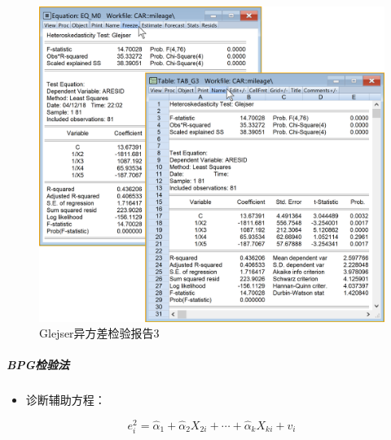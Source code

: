 \documentclass[12pt,(landscape,a4paper),(portrait,a4paper)]{article}
\providecommand{\tightlist}{%
  \setlength{\itemsep}{0pt}\setlength{\parskip}{0pt}}
\let\oldsubparagraph\subparagraph
\renewcommand{\subparagraph}[1]{\oldsubparagraph{#1}\mbox{}}
\begin{document}
\begin{figure}

{\centering \includegraphics[width=28.76in]{picture/lab6-heteroskedasticity/4-test-G3-2} 

}

\caption{Glejser异方差检验报告3}\label{fig:fig-G3-report}
\end{figure}

\hypertarget{bpg}{%
\subparagraph{BPG检验法}\label{bpg}}

\begin{itemize}
\tightlist
\item
  诊断辅助方程：
\end{itemize}

\begin{equation}
e^2_i=\hat{\alpha}_1+\hat{\alpha}_2X_{2i}+\cdots+\hat{\alpha}_kX_{ki}+v_i \label{eq:A-BPG} 
\end{equation}
\end{document}
